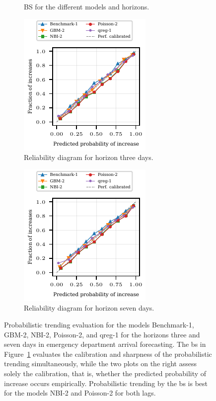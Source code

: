 \documentclass[pdflatex]{sn-jnl}
\theoremstyle{plain}%
\theoremstyle{definition}
\begin{document}
\begin{figure}
    \begin{subfigure}{0.32\textwidth}
    \tiny
    
    \caption{BS for the different models and horizons.}\label{fig:app-eda-prob-brier}
    \end{subfigure}\hspace{0.01\textwidth}%
    \begin{subfigure}[t]{0.32\textwidth}
    \includegraphics{plots/ed_arrival/60_reliability_diagram_lag_3}
    \caption{Reliability diagram for horizon three days.}\label{fig:app-eda-prob-rel-3}
    \end{subfigure}\hspace{0.01\textwidth}%
    \begin{subfigure}[t]{0.32\textwidth}
    \includegraphics{plots/ed_arrival/60_reliability_diagram_lag_7}
    \caption{Reliability diagram for horizon seven days.}\label{fig:app-eda-prob-rel-7}
    \end{subfigure}
    \caption[Probabilistic trending evaluation in emergency department arrival forecasting.]{Probabilistic trending evaluation for the models Benchmark-1, GBM-2, NBI-2, Poisson-2, and qreg-1 for the horizons three and seven days in emergency department arrival forecasting. The \acl{bs} in Figure~\ref{fig:app-eda-prob-brier} evaluates the calibration and sharpness of the probabilistic trending simultaneously, while the two plots on the right assess solely the calibration, that is, whether the predicted probability of increase occurs empirically. Probabilistic trending by the \ac{bs} is best for the models NBI-2 and Poisson-2 for both lags.}
    \label{fig:app-eda-prob}
\end{figure}
\end{document}
